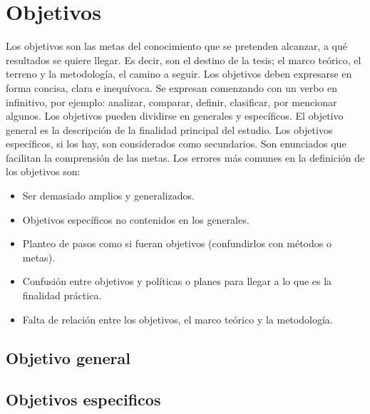 \section{Objetivos}\label{secc:obj}
Los objetivos son las metas del conocimiento que se pretenden alcanzar, a qué resultados se quiere llegar. Es decir, son el destino de la tesis; el marco teórico, el terreno y la metodología, el camino a seguir. Los objetivos deben expresarse en forma concisa, clara e inequívoca. Se expresan comenzando con un verbo en infinitivo, por ejemplo: analizar, comparar, definir, clasificar, por mencionar algunos.
Los objetivos pueden dividirse en generales y específicos. El objetivo general es la descripción de la finalidad principal del estudio. Los objetivos específicos, si los hay, son considerados como secundarios. Son enunciados que facilitan la comprensión de las metas.
Los errores más comunes en la definición de los objetivos son:

\begin{itemize}
    \item Ser demasiado amplios y generalizados.
    \item Objetivos específicos no contenidos en los generales.
    \item Planteo de pasos como si fueran objetivos (confundirlos con métodos o metas).
		\item Confusión entre objetivos y políticas o planes para llegar a lo que es la finalidad práctica.
		\item Falta de relación entre los objetivos, el marco teórico y la metodología.
\end{itemize}

\subsection{Objetivo general}\label{sssec: objg}
\subsection{Objetivos especificos}\label{sssec: obje}

\newpage
